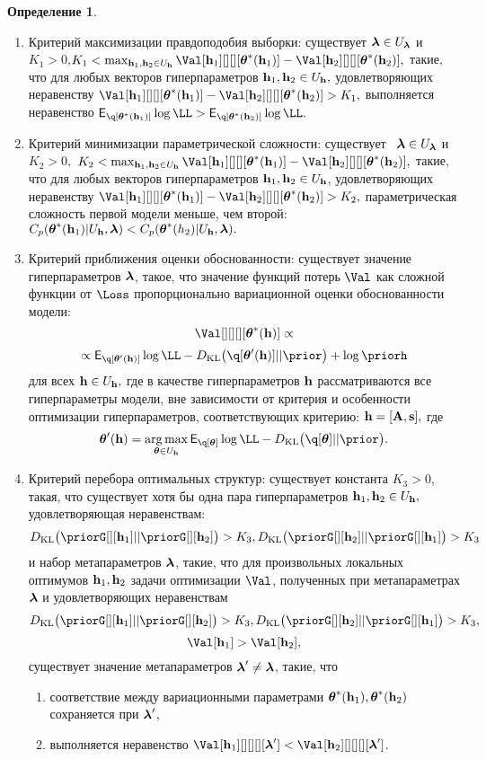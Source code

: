 \documentclass[11pt, a5paper]{dissert}
\theoremstyle{definition}
\newtheorem{defin}{Определение}
\DeclareMathOperator*{\argmax}{arg\,max}
\begin{document}
{\begin{defin}
\begin{enumerate}
\item Критерий максимизации правдоподобия выборки: существует $\boldsymbol{\lambda} \in U_{\boldsymbol{\lambda}}$ и  $K_1>0$,$K_1 < \max_{\h_1,\h_2 \in \Uh} \Val[\h_1][][][\teta^{*}(\h_1)] - \Val[\h_2][][][\teta^{*}(\h_2)],$ такие, что для любых векторов гиперпараметров $\mathbf{h}_1, \mathbf{h}_2 \in U_{\mathbf{h}},$ удовлетворяющих неравенству $\Val[\h_1][][][\teta^{*}(\h_1)] - \Val[\h_2][][][\teta^{*}(\h_2)] > K_1,$ выполняется неравенство $\E_{\q[\teta^{*}(\h_1)]}\log\LL > \E_{\q[\teta^{*}(\h_2)]}\log\LL.$

\item Критерий минимизации параметрической сложности:  существует  $\boldsymbol{\lambda} \in U_{\boldsymbol{\lambda}}$ и $K_2>0,$ $K_2 < \max_{\h_1, \h_2 \in \Uh} \Val[\h_1][][][\teta^{*}(\h_1)] - \Val[\h_2][][][\teta^{*}(\h_2)],$ такие, что для любых векторов гиперпараметров $\mathbf{h}_1,\mathbf{h}_2 \in U_{\mathbf{h}}$, удовлетворяющих неравенству $\Val[\h_1][][][\teta^{*}(\h_1)] - \Val[\h_2][][][\teta^{*}(\h_2)]>K_2,$ параметрическая сложность первой модели меньше, чем второй: $C_p(\boldsymbol{\theta}^{*}(\mathbf{h}_1)|U_{\mathbf{h}},\boldsymbol{\lambda})<C_p(\boldsymbol{\theta}^{*}(h_2)|U_{\mathbf{h}},\boldsymbol{\lambda}).$

\item Критерий приближения оценки обоснованности: существует значение гиперпараметров $\boldsymbol{\lambda}$, такое, что значение функций потерь $\Val$ как сложной функции от $\Loss$ пропорционально вариационной оценки обоснованности модели: $$\Val[][][][\teta^{*}(\h)] \propto $$
$$\propto
\E_{\q[\teta'(\h)]}\log\LL - \KL{\q[\teta'(\h)]}{\prior} + \log\priorh$$ для всех $\mathbf{h} \in U_{\mathbf{h}},$
где в качестве гиперпараметров $\mathbf{h}$ рассматриваются все гиперпараметры модели, вне зависимости от критерия и особенности оптимизации гиперпараметров, соответствующих критерию: $\mathbf{h} = [\mathbf{A}, \mathbf{s}],$
где $$\teta'(\h) = \argmax_{\teta \in \Uh} \E_{\q[\teta]}\log\LL - \KL{\q[\teta]}{\prior}.$$

\item Критерий перебора оптимальных структур: существует константа $K_3>0$, такая, что существует хотя бы одна пара гиперпараметров $\mathbf{h}_1, \mathbf{h}_2 \in U_{\mathbf{h}},$ удовлетворяющая неравенствам:
$$\KL{\priorG[][\h_1]}{\priorG[][\h_2]} > K_3,\KL{\priorG[][\h_2]}{\priorG[][\h_1]}>K_3$$ и набор метапараметров $\boldsymbol{\lambda}$, такие, что для произвольных локальных оптимумов  $\mathbf{h}_1,\mathbf{h}_2$ задачи оптимизации $\Val$, полученных при метапараметрах $\boldsymbol{\lambda}$ и удовлетворяющих неравенствам $$\KL{\priorG[][\h_1]}{\priorG[][\h_2]} > K_3, \KL{\priorG[][\h_2]}{\priorG[][\h_1]}>K_3,$$$$\Val[\h_1] > \Val[\h_2],$$  существует значение метапараметров $\boldsymbol{\lambda}' \neq \boldsymbol{\lambda}$, такие, что
\begin{enumerate}
\item соответствие между вариационными параметрами $\boldsymbol{\theta}^{*}(\mathbf{h}_1),\boldsymbol{\theta}^{*}(\mathbf{h}_2)$ сохраняется при  $\boldsymbol{\lambda}'$,
\item выполняется неравенство $\Val[\h_1][][][][\lam'] < \Val[\h_2][][][][\lam']$.
\end{enumerate}



\end{enumerate}
\end{defin}}
\end{document}
